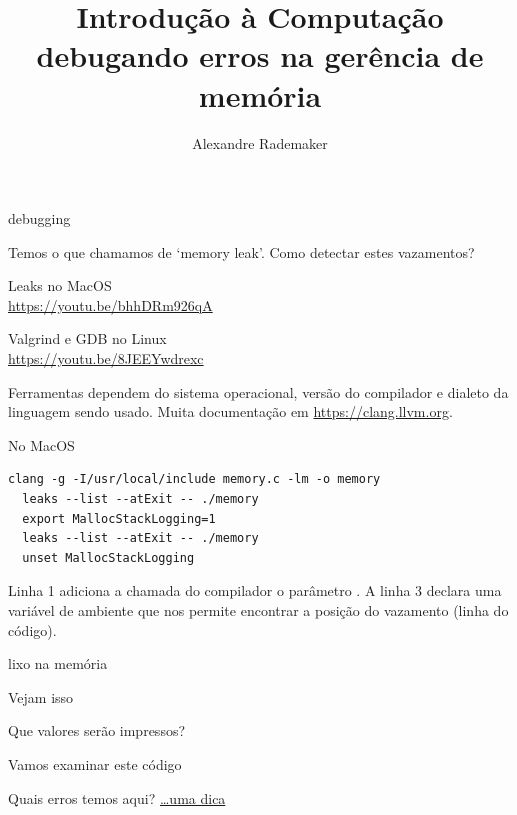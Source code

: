 \documentclass{beamer}
\title{Introdução à Computação \\ debugando erros na gerência de memória}
\author{Alexandre Rademaker}
\date{}
\begin{document}
\begin{frame}
 \maketitle
\end{frame}

\begin{frame}{debugging}

  

  Temos o que chamamos de `memory leak'. Como detectar estes
  vazamentos?

  \framebreak

  Leaks no MacOS\\
  \url{https://youtu.be/bhhDRm926qA}

  Valgrind e GDB no Linux \\
  \url{https://youtu.be/8JEEYwdrexc}

  Ferramentas dependem do sistema operacional, versão do compilador e
  dialeto da linguagem sendo usado. Muita documentação em
  \url{https://clang.llvm.org}.

  \framebreak

  No MacOS

  \begin{lstlisting}[style=code]
  clang -g -I/usr/local/include memory.c -lm -o memory
  leaks --list --atExit -- ./memory
  export MallocStackLogging=1
  leaks --list --atExit -- ./memory
  unset MallocStackLogging
  \end{lstlisting}
 
  Linha 1 adiciona a chamada do compilador o parâmetro . A
  linha 3 declara uma variável de ambiente que nos permite encontrar a
  posição do vazamento (linha do código).
   
\end{frame}


\begin{frame}{lixo na memória}

  Vejam isso

  

  Que valores serão impressos?

  \framebreak

  Vamos examinar este código

  

  Quais erros temos aqui? \href{https://www.youtube.com/watch?v=3uLKjb973HU}{\ldots uma dica}
  
\end{frame}
\end{document}
